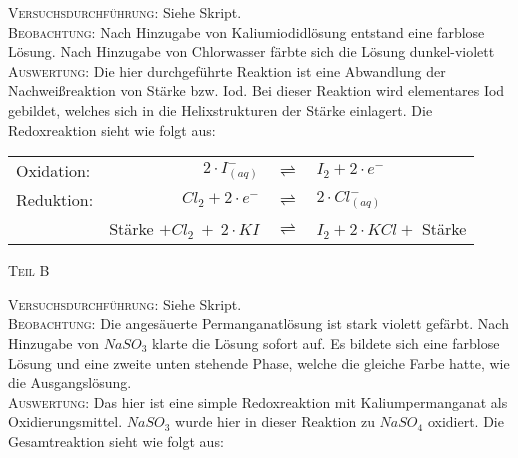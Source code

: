 \documentclass[A4paper, 11p]{article}
\begin{document}
\textsc{Versuchsdurchführung:} Siehe Skript.\\

\textsc{Beobachtung:}\hspace{5mm} Nach Hinzugabe von Kaliumiodidlösung entstand eine farblose Lösung. Nach Hinzugabe von Chlorwasser färbte sich die Lösung dunkel-violett\\

\textsc{Auswertung:}\hspace{8mm} Die hier durchgeführte Reaktion ist eine Abwandlung der Nachweißreaktion von Stärke bzw. Iod. Bei dieser Reaktion wird elementares Iod gebildet, welches sich in die Helixstrukturen der Stärke einlagert. Die Redoxreaktion sieht wie folgt aus:\\

\begin{center} \begin{tabular}{lrcl}
Oxidation: & $2\cdot I^-_{(aq)}$ & $ \rightleftharpoons $ & $ I_2+2\cdot e^-$\\
Reduktion: & $Cl_2+2\cdot e^-$ & $\rightleftharpoons$ & $2\cdot Cl^-_{(aq)}$\\
\hline
 & Stärke $ + Cl_2\ +\ 2\cdot KI$ & $ \rightleftharpoons $ & $I_2+2\cdot KCl +$ Stärke\\
\end{tabular} \end{center}

\begin{center}
\textsc{Teil B}
\end{center}

\textsc{Versuchsdurchführung:} Siehe Skript.\\

\textsc{Beobachtung:}\hspace{5mm} Die angesäuerte Permanganatlösung ist stark violett gefärbt. Nach Hinzugabe von $NaSO_3$ klarte die Lösung sofort auf. Es bildete sich eine farblose Lösung und eine zweite unten stehende Phase, welche die gleiche Farbe hatte, wie die Ausgangslösung.\\

\textsc{Auswertung:}\hspace{8mm} Das hier ist eine simple Redoxreaktion mit Kaliumpermanganat als Oxidierungsmittel. $NaSO_3$ wurde hier in dieser Reaktion zu $NaSO_4$ oxidiert. Die Gesamtreaktion sieht wie folgt aus:\\ 
\end{document}

